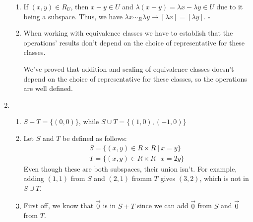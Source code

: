 \documentclass[12pt]{article}
\begin{document}
\begin{enumerate}
\begin{enumerate}
                  \item If $(x,y) \in R_U$, then $x-y \in U$ and $\lambda(x-y)=\lambda x -\lambda y \in U$ due to it being a subspace.
                        Thus, we have $\lambda x \sim_R \lambda y \rightarrow [\lambda x]=[\lambda y]$. $\square$

                  \item When working with equivalence classes we have to establish that the operations' results
                        don't depend on the choice of representative for these classes.

                        We've proved that addition and scaling of equivalence classes doesn't depend on the choice
                        of representative for these classes, so the operations are well defined.
            \end{enumerate}
      \item \begin{enumerate}
                  \item $S+T=\{(0,0)\}$, while $S \cup T=\{(1,0),(-1,0)\}$
                  \item Let $S$ and $T$ be defined as follows:
                        \begin{gather*}
                              S=\{(x, y) \in R \times R\ |\ x=y\} \\
                              T=\{(x, y) \in R \times R\ |\ x=2y\}
                        \end{gather*}
                        Even though these are both subspaces, their union isn't.
                        For example, adding $(1, 1)$ from $S$ and $(2, 1)$ fromm $T$ gives $(3, 2)$, which is not in $S \cup T$.
                  \item First off, we know that $\vec{0}$ is in $S+T$ since we can add $\vec{0}$ from $S$ and $\vec{0}$ from $T$.


\end{enumerate}
\end{enumerate}
\end{document}
